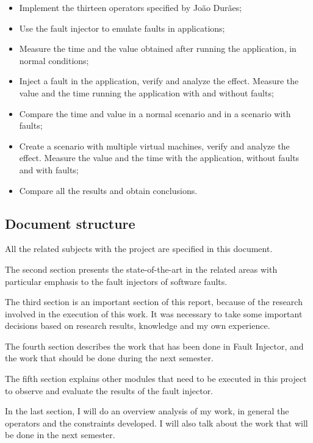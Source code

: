\begin{itemize}
	\item Implement the thirteen operators specified by João Durães;
	\item Use the fault injector to emulate faults in applications;
	\item Measure the time and the value obtained after running the application, in normal conditions;
	\item Inject a fault in the application, verify and analyze the effect. Measure the value and the time running the application with and without faults;
	\item Compare the time and value in a normal scenario and in a scenario with faults;
	\item Create a scenario with multiple virtual machines, verify and analyze the effect. Measure the value and the time with the application, without faults and with faults;
	\item Compare all the results and obtain conclusions.

\end{itemize}


\subsection{Document structure}

All the related subjects with the project are specified in this document.

The second section presents the state-of-the-art in the related areas with particular emphasis to the fault injectors of software faults.

The third section is an important section of this report, because of the research involved in the execution of this work. It was necessary to take some important decisions based on research results, knowledge and my own experience.

The fourth section describes the work that has been done in Fault Injector, and the work that should be done during the next semester.

The fifth section explains other modules that need to be executed in this project to observe and evaluate the results of the fault injector.

In the last section, I will do an overview analysis of my work, in general the operators and the constraints developed. I will also talk about the work that will be done in the next semester.

